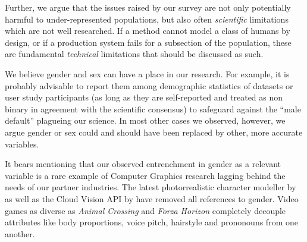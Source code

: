 \documentclass[nonacm,sigconf,review,balance=false]{acmart}
\begin{document}
Further, we argue that the issues raised by our survey are not only potentially harmful to under-represented populations, but also often \emph{scientific} limitations which are not well researched. If a method cannot model a class of humans by design, or if a production system fails for a subsection of the population, these are fundamental \emph{technical} limitations that should be discussed as such.

We believe gender and sex can have a place in our research. For example, it is probably advisable to report them among demographic statistics of datasets or user study participants (as long as they are self-reported and treated as non binary in agreement with the scientific consensus) to
safeguard against the “male default” plagueing our science. In most other cases we observed, however, we argue gender or sex could and should have been replaced by other, more accurate variables.

It bears mentioning that our observed entrenchment in gender as a relevant variable is a rare example of Computer Graphics research
lagging behind the needs of our partner industries. The latest
photorrealistic character modeller by \citet{metahuman} as well as the Cloud Vision API by \citet{googlegender} have removed all references to gender. Video games as diverse as \emph{Animal Crossing} and \emph{Forza Horizon} completely decouple attributes like body proportions, voice pitch, hairstyle and prononouns from one another.
\end{document}
